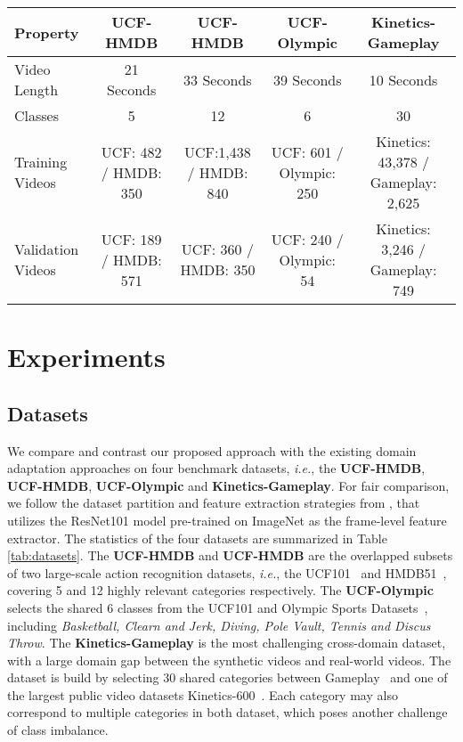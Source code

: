 \begin{table*} 
\centering 
\caption{The general statistics of the four datasets used in our experiments.} \vspace{-0.3cm}\begin{tabular}{l | c c c c } \toprule \textbf{Property} &\textbf{UCF-HMDB} &\textbf{UCF-HMDB} &\textbf{UCF-Olympic} &\textbf{Kinetics-Gameplay} \\ \midrule Video Length & 21 Seconds & 33 Seconds &39 Seconds & 10 Seconds\\ Classes &5 &12 &6 &30\\ Training Videos &UCF: 482 / HMDB: 350 &UCF:1,438 / HMDB: 840 &UCF: 601 / Olympic: 250 & Kinetics: 43,378 / Gameplay: 2,625 \\ Validation Videos &UCF: 189 / HMDB: 571 &UCF: 360 / HMDB: 350 &UCF: 240 / Olympic: 54 & Kinetics: 3,246 / Gameplay: 749 \\ \bottomrule \end{tabular}
\label{tab:datasets}\vspace{-0.3cm}
\end{table*}
\vspace{-0.2cm}
\section{Experiments}
\subsection{Datasets}
We compare and contrast our proposed approach with the existing domain adaptation approaches on four benchmark datasets, \textit{i.e.}, the \textbf{UCF-HMDB}, \textbf{UCF-HMDB}, \textbf{UCF-Olympic} and \textbf{Kinetics-Gameplay}. For fair comparison, we follow the dataset partition and feature extraction strategies from \cite{TAN}, that utilizes the ResNet101 model pre-trained on ImageNet as the frame-level feature extractor. The statistics of the four datasets are summarized in Table \ref{tab:datasets}. The \textbf{UCF-HMDB} and \textbf{UCF-HMDB} are the overlapped subsets of two large-scale action recognition datasets, \textit{i.e.}, the UCF101~\cite{ucf} and HMDB51~\cite{hmdb}, covering 5 and 12 highly relevant categories respectively. The \textbf{UCF-Olympic} selects the shared 6 classes from the UCF101 and Olympic Sports Datasets~\cite{olympic}, including \textit{Basketball, Clearn and Jerk, Diving, Pole Vault, Tennis and Discus Throw}. The \textbf{Kinetics-Gameplay} is the most challenging cross-domain dataset, with a large domain gap between the synthetic videos and real-world videos. The dataset is build by selecting 30 shared categories between Gameplay~\cite{TAN} and one of the largest public video datasets Kinetics-600~\cite{kinetics}. Each category may also correspond to multiple categories in both dataset, which poses another challenge of class imbalance.
\vspace{-0.3cm}

